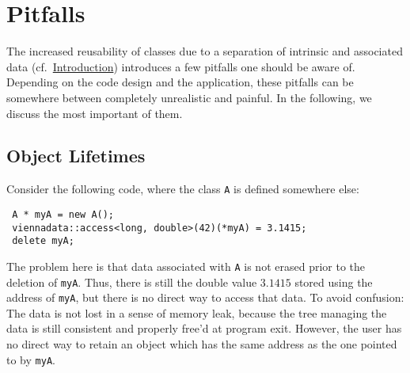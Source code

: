 \chapter{Pitfalls} \label{chap:pitfalls}



The increased reusability of classes due to a separation of intrinsic and associated data (cf.~\hyperref[intro]{Introduction})
introduces a few pitfalls one should be aware of. Depending on the code design and the application,
these pitfalls can be somewhere between completely unrealistic and painful. In the following, we discuss the most important of them.

\section{Object Lifetimes}
Consider the following code, where the class \lstinline|A| is defined somewhere else:
\begin{lstlisting}
 A * myA = new A();
 viennadata::access<long, double>(42)(*myA) = 3.1415;
 delete myA;
\end{lstlisting}
The problem here is that data associated with \lstinline|A| is not erased prior to the deletion of \lstinline|myA|.
Thus, there is still the double value $3.1415$ stored using the address of \lstinline|myA|, but there is no direct way to access that data.
To avoid confusion: The data is not lost in a sense of memory leak, because the tree managing the data is still consistent and properly free'd at program exit.
However, the user has no direct way to retain an object which has the same address as the one pointed to by \lstinline|myA|.

